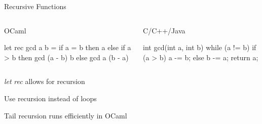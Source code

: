 \documentclass{plt}
\begin{document}

\begin{frame}[fragile]{Recursive Functions}

  \begin{columns}
    \begin{column}[t]{0.5\textwidth}
OCaml

\begin{ocaml}
let rec gcd a b =
  if a = b then
    a
  else if a > b then
    gcd (a - b) b
  else
    gcd a (b - a)
\end{ocaml}
    \end{column}
    \begin{column}[t]{0.5\textwidth}
C/C++/Java

\begin{C}
int gcd(int a, int b)
{
  while (a != b) {
    if (a > b)
      a -= b;
    else
      b -= a;
  }
  return a;
}
\end{C}
    \end{column}
  \end{columns}

\emph{let} \emph{rec} allows for recursion

Use recursion instead of loops
  
Tail recursion runs efficiently in OCaml
\end{frame}
\end{document}
